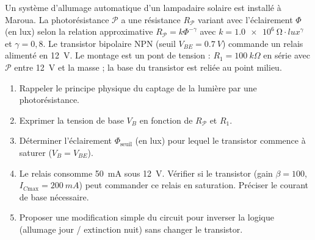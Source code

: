 \documentclass[11pt]{article}
\begin{document}
\begin{exercice}
Un système d'allumage automatique d'un lampadaire solaire est installé à Maroua. La photorésistance $\mathcal{P}$ a une résistance $R_{\mathcal{P}}$ variant avec l'éclairement $\Phi$ (en lux) selon la relation approximative $R_{\mathcal{P}} = k \Phi^{-\gamma}$ avec $k = \SI{1,0e6}{\ohm \cdot lux^{\gamma}}$ et $\gamma = 0,8$. Le transistor bipolaire NPN (seuil $V_{BE} = \SI{0,7}{V}$) commande un relais alimenté en \SI{12}{V}. Le montage est un pont de tension : $R_1 = \SI{100}{k\Omega}$ en série avec $\mathcal{P}$ entre \SI{12}{V} et la masse ; la base du transistor est reliée au point milieu.
\begin{enumerate}
    \item Rappeler le principe physique du captage de la lumière par une photorésistance.
    \item Exprimer la tension de base $V_B$ en fonction de $R_{\mathcal{P}}$ et $R_1$.
    \item Déterminer l'éclairement $\Phi_{\text{seuil}}$ (en lux) pour lequel le transistor commence à saturer ($V_B = V_{BE}$).
    \item Le relais consomme \SI{50}{mA} sous \SI{12}{V}. Vérifier si le transistor (gain $\beta = 100$, $I_{C\text{max}} = \SI{200}{mA}$) peut commander ce relais en saturation. Préciser le courant de base nécessaire.
    \item Proposer une modification simple du circuit pour inverser la logique (allumage jour / extinction nuit) sans changer le transistor.
\end{enumerate}
\end{exercice}
\end{document}
